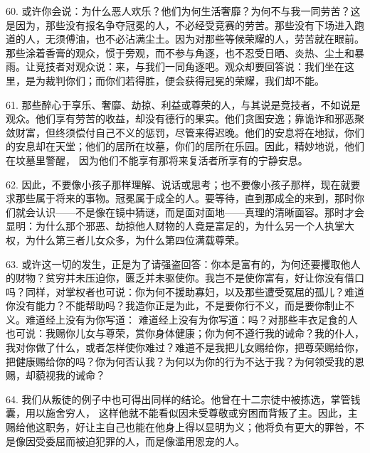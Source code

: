 60. 或许你会说：为什么恶人欢乐？他们为何生活奢靡？为何不与我一同劳苦？这是因为，那些没有报名争夺冠冕的人，不必经受竞赛的劳苦。那些没有下场进入跑道的人，无须傅油，也不必沾满尘土。因为对那些等候荣耀的人，劳苦就在眼前。那些涂着香膏的观众，惯于旁观，而不参与角逐，也不忍受日晒、炎热、尘土和暴雨。让竞技者对观众说：来，与我们一同角逐吧。观众却要回答说：我们坐在这里，是为裁判你们；而你们若得胜，便会获得冠冕的荣耀，我们却不能。\par

61. 那些醉心于享乐、奢靡、劫掠、利益或尊荣的人，与其说是竞技者，不如说是观众。他们享有劳苦的收益，却没有德行的果实。他们贪图安逸；靠诡诈和邪恶聚敛财富，但终须偿付自己不义的惩罚，尽管来得迟晚。他们的安息将在地狱，你们的安息却在天堂；他们的居所在坟墓，你们的居所在乐园。因此，精妙地说，他们在坟墓里警醒， 因为他们不能享有那将来复活者所享有的宁静安息。\par

62. 因此，不要像小孩子那样理解、说话或思考；也不要像小孩子那样，现在就要求那些属于将来的事物。冠冕属于成全的人。要等待，直到那成全的来到，那时你们就会认识——不是像在镜中猜谜，而是面对面地——真理的清晰面容。那时才会显明：为什么那个邪恶、劫掠他人财物的人竟是富足的，为什么另一个人执掌大权，为什么第三者儿女众多，为什么第四位满载尊荣。\par

63. 或许这一切的发生，正是为了请强盗回答：你本是富有的，为何还要攫取他人的财物？贫穷并未压迫你，匮乏并未驱使你。我岂不是使你富有，好让你没有借口吗？同样，对掌权者也可说：你为何不援助寡妇，以及那些遭受冤屈的孤儿？难道你没有能力？不能帮助吗？我造你正是为此，不是要你行不义，而是要你制止不义。难道经上没有为你写道： 难道经上没有为你写道：吗？对那些丰衣足食的人也可说：我赐你儿女与尊荣，赏你身体健康；你为何不遵行我的诫命？我的仆人，我对你做了什么，或者怎样使你难过？难道不是我把儿女赐给你，把尊荣赐给你，把健康赐给你的吗？你为何否认我？为何以为你的行为不达于我？为何领受我的恩赐，却藐视我的诫命？\par

64. 我们从叛徒的例子中也可得出同样的结论。他曾在十二宗徒中被拣选，掌管钱囊，用以施舍穷人， 这样他就不能看似因未受尊敬或穷困而背叛了主。因此，主赐给他这职务，好让主自己也能在他身上得以显明为义；他将负有更大的罪咎，不是像因受委屈而被迫犯罪的人，而是像滥用恩宠的人。\par



